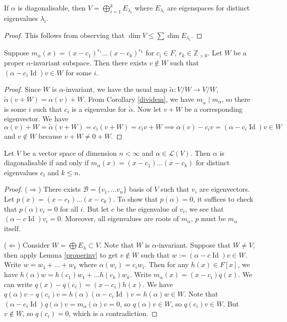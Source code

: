 \documentclass{scrartcl}
\def\le{\leqslant}
\def\Z{\mathbb{Z}}
\def\L{\mathcal{L}}
\def\B{\mathcal{B}}
\DeclareMathOperator{\id}{Id}
\begin{document}
\begin{corollary}
	If $\alpha$ is diagonalisable, then $V=\bigoplus_{i=1}^k E_{\lambda_i}$ where $E_{\lambda_i}$ are eigenspaces for distinct eigenvalues $\lambda_i$.
\end{corollary}
\begin{proof}
	This follows from observing that $\dim{V} \le \sum \dim E_{\lambda_i}$.
\end{proof}
\begin{lemma} \label{properinv}
	Suppose $m_\alpha(x) = (x-c_1)^{r_1}\dots (x-c_k)^{r_k}$ for $c_i \in F$, $r_k \in \Z_{>0}$. Let $W$ be a proper $\alpha$-invariant subspace. Then there exists $v \notin W$ such that $(\alpha-c_i\id)v \in W$ for some $i$. 
\end{lemma}
\begin{proof}
	Since $W$ is $\alpha$-invariant, we have the usual map $\tilde{\alpha}: V/W \to V/W$, $\tilde{\alpha}(v+W) = \alpha(v) + W$. From Corollary \ref{dividem}, we have $m_{\tilde{\alpha}} \mid m_\alpha$, so there is some $i$ such that $c_i$ is a eigenvalue for $\tilde{\alpha}$. Now let $v+W$ be a corresponding eigenvector. We have
	\[\alpha(v) + W = \tilde{\alpha}(v+W) = c_i(v+W) = c_iv + W \implies \alpha(v)-c_iv=(\alpha-c_i\id)v \in W\]
	and $v \notin W$ because $v+W \ne 0+W$. 
\end{proof}
\begin{theorem}
	Let $V$ be a vector space of dimension $n < \infty$ and $\alpha \in \L(V)$. Then $\alpha$ is diagonalisable if and only if $m_\alpha(x) = (x-c_1)\dots(x-c_k)$ for distinct eigenvalues $c_i$ and $k \le n$. 
\end{theorem}
\begin{proof}
	($\Rightarrow$) There exists $\B = \{v_1, \dots v_n\}$ basis of $V$ such that $v_i$ are eigenvectors. Let $p(x) = (x-c_1)\dots(x-c_k)$. To show that $p(\alpha)=0$, it suffices to check that $p(\alpha)v_i = 0$ for all $i$. But let $c$ be the eigenvalue of $v_i$, we see that $(\alpha-c\id)v_i = 0$. Moreover, all eigenvalues are roots of $m_\alpha$, $p$ must be $m_\alpha$ itself. 
	\par ($\Leftarrow$) Consider $W = \bigoplus E_\lambda \subset V$. Note that $W$ is $\alpha$-invariant. Suppose that $W \ne V$, then apply Lemma \ref{properinv} to get $v \notin W$ such that $w:= (\alpha-c\id)v \in W$. Write $w = w_1+\dots+w_k$ where $\alpha(w_i) = c_iw_i$. Then for any $h(x) \in F[x]$, we have $h(\alpha)w = h(c_1)w_1+\dots h(c_k)w_k$. Write $m_\alpha(x) = (x-c_i)q(x)$. We can write $q(x)-q(c_i) = (x-c_i)h(x)$. We have $q(\alpha)v - q(c_i)v = h(\alpha)(\alpha-c_i\id)v = h(\alpha)w \in W$. Note that $(\alpha-c_i\id)q(\alpha)v = m_\alpha(\alpha)v = 0$, so $q(\alpha)v \in W$, so $q(c_i)v \in W$. But $v \notin W$, so $q(c_i)=0$, which is a contradiction. 
\end{proof}
\end{document}
